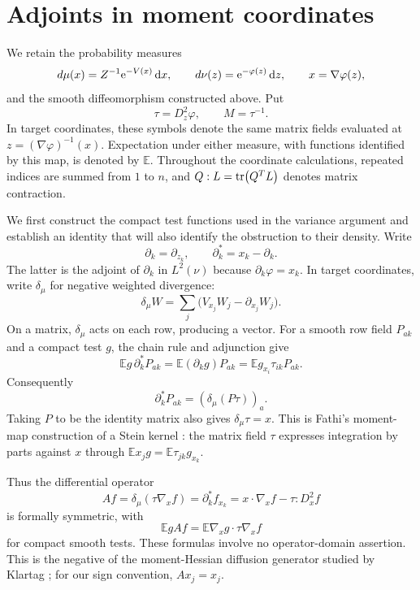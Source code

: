 \section{Adjoints in moment coordinates}\label{sec:identities}

We retain the probability measures
\[
 d\mu(x)=Z^{-1}\mathrm{e}^{-V(x)}\,\mathrm{d} x,
 \qquad d\nu(z)=\mathrm{e}^{-\varphi(z)}\,\mathrm{d} z,
 \qquad x=\nabla\varphi(z),
\]
and the smooth diffeomorphism constructed above.  Put
\[
 \tau=D_z^2\varphi,\qquad M=\tau^{-1}.
\]
In target coordinates, these symbols denote the same matrix fields evaluated at $z=(\nabla\varphi)^{-1}(x)$. Expectation under either measure, with functions identified by this map, is denoted by $\mathbb{E}$. Throughout the coordinate calculations, repeated indices are summed from $1$ to $n$, and $Q:L=\tr(Q^TL)$ denotes matrix contraction.

We first construct the compact test functions used in the variance argument and establish an identity that will also identify the obstruction to their density.  Write
\[
 \partial_k=\partial_{z_k},\qquad
 \partial_k^*=x_k-\partial_k.
\]
The latter is the adjoint of $\partial_k$ in $L^2(\nu)$ because $\partial_k\varphi=x_k$.  In target coordinates, write $\delta_\mu$ for negative weighted divergence:
\[
 \delta_\mu W
 =\sum_j\bigl(V_{x_j}W_j-\partial_{x_j}W_j\bigr).
\]
On a matrix, $\delta_\mu$ acts on each row, producing a vector. For a smooth row field $P_{ak}$ and a compact test $g$, the chain rule and adjunction give
\[
 \mathbb{E}g\,\partial_k^*P_{ak}
 =\mathbb{E}(\partial_k g)P_{ak}
 =\mathbb{E}g_{x_i}\tau_{ik}P_{ak}.
\]
Consequently
\begin{equation}\label{eq:row-adjoint}
 \partial_k^*P_{ak}=(\delta_\mu(P\tau))_a.
\end{equation}
Taking $P$ to be the identity matrix also gives $\delta_\mu\tau=x$. This is Fathi's moment-map construction of a Stein kernel \cite[Theorem~2.3 of the cited arXiv version]{Fathi2019}: the matrix field $\tau$ expresses integration by parts against $x$ through $\mathbb{E}x_j g=\mathbb{E}\tau_{jk}g_{x_k}$.

Thus the differential operator
\begin{equation}\label{eq:operator-A}
 Af=\delta_\mu(\tau\nabla_x f)
   =\partial_k^*f_{x_k}
   =x\cdot\nabla_x f-\tau:D_x^2f
\end{equation}
is formally symmetric, with
\begin{equation}\label{eq:A-form}
 \mathbb{E}gAf=\mathbb{E}\nabla_xg\cdot\tau\nabla_xf
\end{equation}
for compact smooth tests.  These formulas involve no operator-domain assertion. This is the negative of the moment-Hessian diffusion generator studied by Klartag \cite[equation~(68)]{Klartag2014Moment}; for our sign convention, $Ax_j=x_j$.

